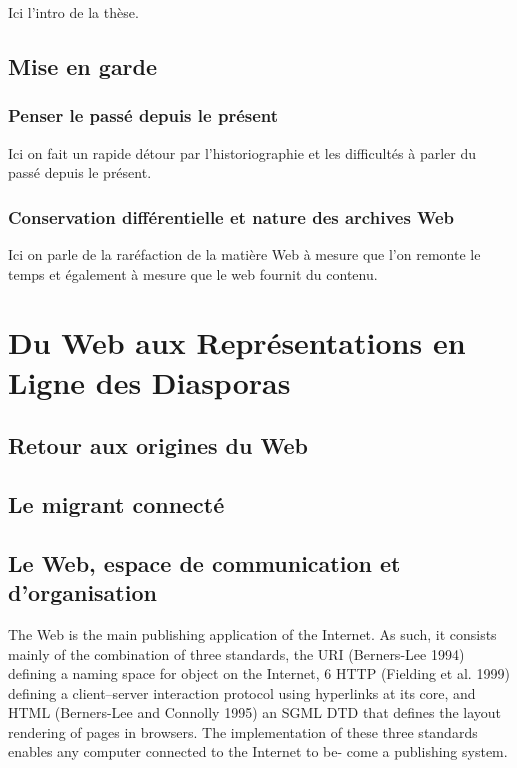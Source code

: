 \documentclass[symmetric,justified,marginals=raggedouter]{tufte-book}
\begin{document}
Ici l'intro de la thèse.

\section{Mise en garde}

\subsection{Penser le passé depuis le présent}

Ici on fait un rapide détour par l'historiographie et les difficultés à parler du passé depuis le présent.

\subsection{Conservation différentielle et nature des archives Web}

Ici on parle de la raréfaction de la matière Web à mesure que l'on remonte le temps et également à mesure que le web fournit du contenu.


\chapter{Du Web aux Représentations en Ligne des Diasporas}
\label{chap:2}

\section{Retour aux origines du Web}
\label{sec:2_web}

\section{Le migrant connecté}

\section{Le Web, espace de communication et d'organisation}

The Web is the main publishing application of the Internet.
As such, it consists mainly of the combination of three standards, the URI (Berners-Lee 1994) defining a naming space for object on the Internet, 6 HTTP (Fielding et al. 1999) defining a client–server interaction protocol using hyperlinks at its core, and HTML (Berners-Lee and Connolly 1995) an SGML DTD that defines the layout rendering of pages in browsers.
The implementation of these three standards enables any computer connected to the Internet to be- come a publishing system.
\end{document}
